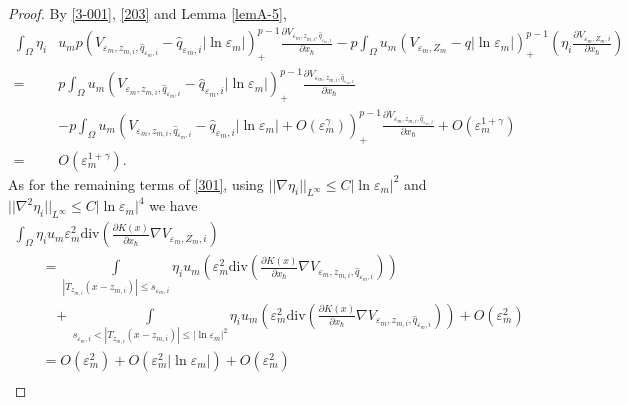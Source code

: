 \documentclass[12pt,reqno]{amsart}
\numberwithin{equation}{section}
\theoremstyle{definition}
\theoremstyle{remark}
\begin{document}
\begin{proof}
By \eqref{3-001}, \eqref{203} and Lemma \ref{lemA-5},  
\begin{equation}\label{302}
\begin{split}
\int_{\Omega}\eta_i&u_mp\left( V_{\varepsilon_m, z_{m,i}, \hat{q}_{\varepsilon_m,i}}-\hat{q}_{\varepsilon_m,i}|\ln\varepsilon_m|\right)^{p-1}_+\frac{\partial V_{\varepsilon_m, z_{m,i}, \hat{q}_{\varepsilon_m,i}}}{\partial x_\hbar}-  p\int_{\Omega}u_m\left (V_{\varepsilon_m, Z_m}-q|\ln\varepsilon_m|\right )^{p-1}_+\left( \eta_i\frac{\partial V_{\varepsilon_m, Z_{m},i}}{\partial x_\hbar}\right)\\
=&p\int_{\Omega}u_m\left( V_{\varepsilon_m, z_{m,i}, \hat{q}_{\varepsilon_m,i}}-\hat{q}_{\varepsilon_m,i}|\ln\varepsilon_m|\right)^{p-1}_+\frac{\partial V_{\varepsilon_m, z_{m,i}, \hat{q}_{\varepsilon_m,i}}}{\partial x_\hbar}\\
&-p\int_{\Omega}u_m\left( V_{\varepsilon_m, z_{m,i}, \hat{q}_{\varepsilon_m,i}}-\hat{q}_{\varepsilon_m,i}|\ln\varepsilon_m|+O\left( \varepsilon_m^\gamma\right) \right)^{p-1}_+\frac{\partial V_{\varepsilon_m, z_{m,i}, \hat{q}_{\varepsilon_m,i}}}{\partial x_\hbar}+O\left( \varepsilon_m^{1+\gamma}\right)\\
=&O\left( \varepsilon_m^{1+\gamma}\right).
\end{split}
\end{equation}
As for the remaining terms of \eqref{301}, %
using $ ||\nabla\eta_i||_{L^\infty}\leq C|\ln\varepsilon_m|^{2}$ and $ ||\nabla^2\eta_i||_{L^\infty}\leq C|\ln\varepsilon_m|^{4} $ we have
\begin{equation}\label{304}
\begin{array}{ll}
\int_{\Omega}\eta_iu_m\varepsilon_m^2\text{div}\left (\frac{\partial K(x)}{\partial x_\hbar}\nabla V_{\varepsilon_m, Z_{m},i}  \right )&\\
\qquad=\int\limits_{|T_{z_{m,i}}(x-z_{m,i})|\leq s_{\varepsilon_m,i}}\eta_iu_m \left( \varepsilon_m^2\text{div}\left( \frac{\partial K(x)}{\partial x_\hbar}\nabla V_{\varepsilon_m, z_{m,i}, \hat{q}_{\varepsilon_m,i}}\right)\right)&\\
\qquad\,\,\,\,\,+\int\limits_{ s_{\varepsilon_m,i}<|T_{z_{m,i}}(x-z_{m,i})|\leq |\ln\varepsilon_m|^{2}}
\eta_iu_m \left( \varepsilon_m^2\text{div}\left( \frac{\partial K(x)}{\partial x_\hbar}\nabla V_{\varepsilon_m, z_{m,i}, \hat{q}_{\varepsilon_m,i}}\right)\right)+O\left( \varepsilon_m^2\right)  &\\
\qquad=O\left(\varepsilon_m^2\right) +O\left (\varepsilon_m^2|\ln\varepsilon_m|\right )+O\left( \varepsilon_m^2\right)&\\

\end{array}
\end{equation}
\end{proof}
\end{document}
